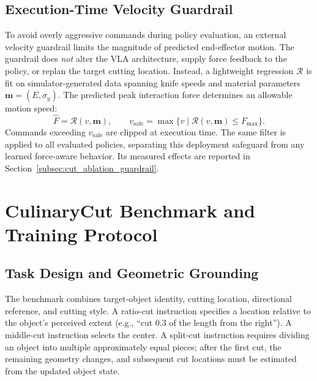\FloatBarrier

\subsection{Execution-Time Velocity Guardrail}
\label{subsec:cut_guardrail}

To avoid overly aggressive commands during policy evaluation, an external velocity guardrail limits the magnitude of predicted end-effector motion. The guardrail does \emph{not} alter the VLA architecture, supply force feedback to the policy, or replan the target cutting location. Instead, a lightweight regression $\mathcal{R}$ is fit on simulator-generated data spanning knife speeds and material parameters $\mathbf{m}=(E,\sigma_y)$. The predicted peak interaction force determines an allowable motion speed:
\begin{equation}\label{eq:cut_guardrail}
  \hat F=\mathcal{R}(v,\mathbf{m}),\qquad
  v_{\mathrm{safe}}=\max\bigl\{v\mid
    \mathcal{R}(v,\mathbf{m})\le F_{\max}\bigr\}.
\end{equation}
Commands exceeding $v_{\mathrm{safe}}$ are clipped at execution time. The same filter is applied to all evaluated policies, separating this deployment safeguard from any learned force-aware behavior. Its measured effects are reported in Section~\ref{subsec:cut_ablation_guardrail}.

\FloatBarrier

\section{CulinaryCut Benchmark and Training Protocol}
\label{sec:cut_benchmark}

\subsection{Task Design and Geometric Grounding}
\label{subsec:cut_task_design}

The benchmark combines target-object identity, cutting location, directional reference, and cutting style. A ratio-cut instruction specifies a location relative to the object's perceived extent (e.g., ``cut 0.3 of the length from the right''). A middle-cut instruction selects the center. A split-cut instruction requires dividing an object into multiple approximately equal pieces; after the first cut, the remaining geometry changes, and subsequent cut locations must be estimated from the updated object state.

